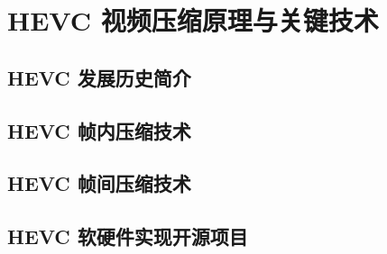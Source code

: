 \chapter{HEVC 视频压缩原理与关键技术}
\label{cha:c2}

\section{HEVC 发展历史简介}

\section{HEVC 帧内压缩技术}

\section{HEVC 帧间压缩技术}

\section{HEVC 软硬件实现开源项目}